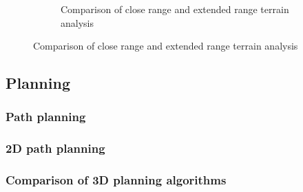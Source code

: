 \documentclass[11pt]{article}
\begin{document}
        

        \begin{figure}
            \begin{figure}[H]
                \centering
                \caption{Comparison of close range and extended range terrain analysis}
            \end{figure}
        \end{figure}

    \subsection{Planning}
        \subsubsection{Path planning}
        \subsubsection{2D path planning}
        \subsubsection{Comparison of 3D planning algorithms}
\end{document}
